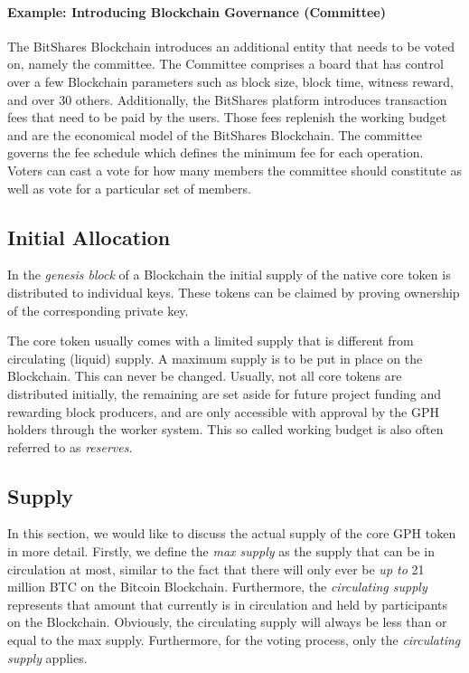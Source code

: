 \paragraph{Example: Introducing Blockchain Governance (Committee) }
The BitShares Blockchain introduces an additional entity that needs to be voted on, namely the committee. 
The Committee comprises a board that has control over a few Blockchain parameters such as block size, block time, witness reward, and over 30 others. 
Additionally, the BitShares platform introduces transaction fees that need to be paid by the users. Those fees replenish the working budget and are the economical 
model of the BitShares Blockchain. The committee governs the fee schedule which defines the minimum fee for each operation. Voters can cast a vote 
for how many members the committee should constitute as well as vote for a particular set of members.

\subsection{ Initial Allocation }
In the \emph{genesis block} of a Blockchain the initial supply of the native core token is distributed to individual keys. These tokens can be claimed by proving ownership of the corresponding private key.

The core token usually comes with a limited supply that is different from circulating (liquid) supply. A maximum supply is to be put in place on the Blockchain. This can never be changed.
Usually, not all core tokens are  distributed initially, the remaining are set aside for future project funding and rewarding block 
producers, and are only accessible with approval by the GPH holders through the worker system. This so called working budget is also often referred 
to as \emph{reserves}. 

\subsection{ Supply }
In this section, we would like to discuss the actual supply of the core GPH token in more detail. Firstly, we define the \emph{max supply} as the supply that 
can be in circulation  at most, similar to the fact that there will only ever be \emph{up to} 21 million BTC on the Bitcoin Blockchain. Furthermore, the \emph{circulating 
supply} represents that amount that currently is in circulation and held by participants on the Blockchain. Obviously, the circulating supply will 
always be less than or equal to the max supply. Furthermore, for the voting process, only the \emph{circulating supply} applies.


